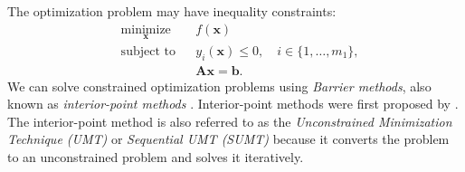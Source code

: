 \documentclass[lang=cn,10pt]{gorgeousnbook}
\numberwithin{equation}{section}%
\numberwithin{figure}{section}%
\begin{document}
The optimization problem may have inequality constraints:
\begin{equation}\label{equation_optimization_problem_interior_point_method}
\begin{aligned}
& \underset{\boldsymbol{x}}{\text{minimize}}
& & f(\boldsymbol{x}) \\
& \text{subject to}
& & y_i(\boldsymbol{x}) \leq 0, \quad i \in \{1, \dots, m_1\}, \\
& & & \boldsymbol{A} \boldsymbol{x} = \boldsymbol{b}.
\end{aligned}
\end{equation}
We can solve constrained optimization problems using \textit{Barrier methods}, also known as \textit{interior-point methods} \cite{nesterov1994interior,potra2000interior,boyd2004convex,wright2005interior}. Interior-point methods were first proposed by \cite{dikin1967iterative}. 
The interior-point method is also referred to as the \textit{Unconstrained Minimization Technique (UMT)} or \textit{Sequential UMT (SUMT)} \cite{fiacco1967sequential} because it converts the problem to an unconstrained problem and solves it iteratively. 
\end{document}
